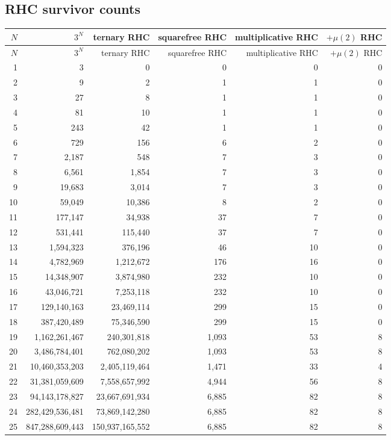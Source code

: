 \documentclass[11pt]{article}
\begin{document}
\subsection{RHC survivor counts}
\begin{center}\scriptsize\begin{longtable}{r r r r r r}
\toprule $N$ & $3^N$ & ternary RHC & squarefree RHC & multiplicative RHC & $+\mu(2)$ RHC\\ \midrule\endfirsthead
\toprule $N$ & $3^N$ & ternary RHC & squarefree RHC & multiplicative RHC & $+\mu(2)$ RHC\\ \midrule\endhead
1 & 3 & 0 & 0 & 0 & 0\\
2 & 9 & 2 & 1 & 1 & 0\\
3 & 27 & 8 & 1 & 1 & 0\\
4 & 81 & 10 & 1 & 1 & 0\\
5 & 243 & 42 & 1 & 1 & 0\\
6 & 729 & 156 & 6 & 2 & 0\\
7 & 2{,}187 & 548 & 7 & 3 & 0\\
8 & 6{,}561 & 1{,}854 & 7 & 3 & 0\\
9 & 19{,}683 & 3{,}014 & 7 & 3 & 0\\
10 & 59{,}049 & 10{,}386 & 8 & 2 & 0\\
11 & 177{,}147 & 34{,}938 & 37 & 7 & 0\\
12 & 531{,}441 & 115{,}440 & 37 & 7 & 0\\
13 & 1{,}594{,}323 & 376{,}196 & 46 & 10 & 0\\
14 & 4{,}782{,}969 & 1{,}212{,}672 & 176 & 16 & 0\\
15 & 14{,}348{,}907 & 3{,}874{,}980 & 232 & 10 & 0\\
16 & 43{,}046{,}721 & 7{,}253{,}118 & 232 & 10 & 0\\
17 & 129{,}140{,}163 & 23{,}469{,}114 & 299 & 15 & 0\\
18 & 387{,}420{,}489 & 75{,}346{,}590 & 299 & 15 & 0\\
19 & 1{,}162{,}261{,}467 & 240{,}301{,}818 & 1{,}093 & 53 & 8\\
20 & 3{,}486{,}784{,}401 & 762{,}080{,}202 & 1{,}093 & 53 & 8\\
21 & 10{,}460{,}353{,}203 & 2{,}405{,}119{,}464 & 1{,}471 & 33 & 4\\
22 & 31{,}381{,}059{,}609 & 7{,}558{,}657{,}992 & 4{,}944 & 56 & 8\\
23 & 94{,}143{,}178{,}827 & 23{,}667{,}691{,}934 & 6{,}885 & 82 & 8\\
24 & 282{,}429{,}536{,}481 & 73{,}869{,}142{,}280 & 6{,}885 & 82 & 8\\
25 & 847{,}288{,}609{,}443 & 150{,}937{,}165{,}552 & 6{,}885 & 82 & 8\\
\bottomrule\end{longtable}\end{center}
\end{document}
